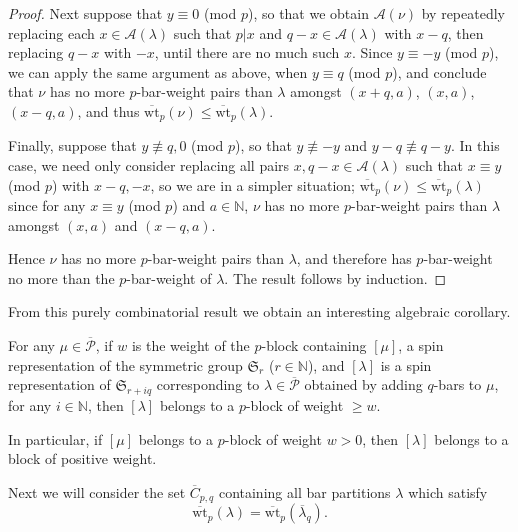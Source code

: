 \documentclass[ALCO, Unicode,published]{cedram}
\begin{document}
\begin{proof}
Next suppose that $y\equiv0$ (mod $p$), so that we obtain $\mathcal{A}(\nu)$ by repeatedly replacing each $x\in\mathcal{A}(\lambda)$ such that $p|x$ and $q-x\in\mathcal{A}(\lambda)$ with $x-q$, then replacing $q-x$ with $-x$, until there are no much such $x$. Since $y\equiv-y$ (mod $p$), we can apply the same argument as above, when $y\equiv q$ (mod $p$), and conclude that $\nu$ has no more $p$-bar-weight pairs than $\lambda$ amongst $(x+q,a)$, $(x,a)$, $(x-q,a)$, and thus $\overline{\text{wt}}_p(\nu)\leq\overline{\text{wt}}_p(\lambda)$. 

Finally, suppose that $y\not\equiv q,0$ (mod $p$), so that $y\not\equiv-y$ and $y-q\not\equiv q-y$. In this case, we need only consider replacing all pairs $x,q-x\in\mathcal{A}(\lambda)$ such that $x\equiv y$ (mod $p$) with $x-q,-x$, so we are in a simpler situation; $\overline{\text{wt}}_p(\nu)\leq\overline{\text{wt}}_p(\lambda)$ since for any $x\equiv y$ (mod $p$) and $a\in\mathbb{N}$, $\nu$ has no more $p$-bar-weight pairs than $\lambda$ amongst $(x,a)$ and $(x-q,a)$.

Hence $\nu$ has no more $p$-bar-weight pairs than $\lambda$, and therefore has $p$-bar-weight no more than the $p$-bar-weight of $\lambda$. The result follows by induction.
\end{proof}

From this purely combinatorial result we obtain an interesting algebraic corollary. 

\begin{coro}For any $\mu\in\overline{\mathcal{P}}$, if $w$ is the weight of the $p$-block containing $[\mu]$, a spin representation of the symmetric group $\mathfrak{S}_r$ ($r\in\mathbb{N}$), and $[\lambda]$ is a spin representation of $\mathfrak{S}_{r+iq}$ corresponding to $\lambda\in\overline{\mathcal{P}}$ obtained by adding $q$-bars to $\mu$, for any $i\in\mathbb{N}$, then $[\lambda]$ belongs to a $p$-block of weight $\geq w$. 

In particular, if $[\mu]$ belongs to a $p$-block of weight $w>0$, then $[\lambda]$ belongs to a block of positive weight. 
\end{coro}

Next we will consider the set $\overline{C}_{p,q}$ containing all bar partitions $\lambda$ which satisfy 
$$\overline{\text{wt}}_p(\lambda)=\overline{\text{wt}}_p(\overline{\lambda}_q).$$
\end{document}
